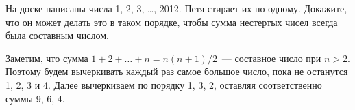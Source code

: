 На доске написаны числа 1, 2, 3, \ldots, 2012.
Петя стирает их по одному.
Докажите, что он может делать это в таком порядке, чтобы сумма нестертых чисел
всегда была составным числом.

\solution
Заметим, что сумма $1 + 2 + \ldots + n = n (n + 1) / 2$~--- составное число при
$n > 2$.
Поэтому будем вычеркивать каждый раз самое большое число, пока не останутся
1, 2, 3 и 4.
Далее вычеркиваем по порядку 1, 3, 2, оставляя соответственно суммы 9, 6, 4.

